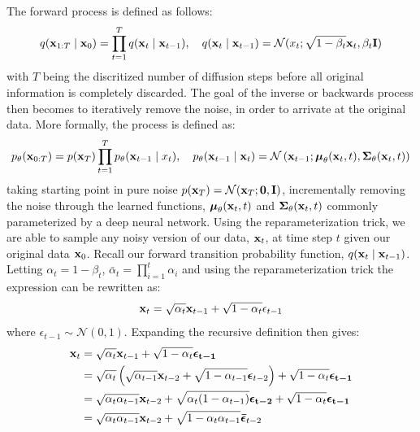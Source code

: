 The forward process is defined as follows:
\begin{equation}    
    q(\boldsymbol{\mathbf{x}}_{1:T} \mid \boldsymbol{\mathbf{x}}_{0}) = \prod_{t=1}^T q(\boldsymbol{\mathbf{x}}_{t} \mid \boldsymbol{\mathbf{x}}_{t-1}), \quad q(\boldsymbol{\mathbf{x}}_{t} \mid \boldsymbol{\mathbf{x}}_{t-1}) = \mathcal{N}(x_{t}; \sqrt{1 - \beta_t}\boldsymbol{\mathbf{x}}_t,\beta_t \boldsymbol{\mathbf{I}} )
\end{equation}
with $T$ being the discritized number of diffusion steps before all original information is completely discarded. The goal of the inverse or backwards process then becomes to iteratively remove the noise, in order to arrivate at the original data. More formally, the process is defined as:
\begin{equation}
    p_\theta(\boldsymbol{\mathbf{x}}_{0:T}) = p(\boldsymbol{\mathbf{x}}_T) \prod_{t=1}^T p_\theta(\boldsymbol{\mathbf{x}}_{t-1} \mid x_{t}), \quad p_\theta(\boldsymbol{\mathbf{x}}_{t-1} \mid \boldsymbol{\mathbf{x}}_{t}) = \mathcal{N}\left(\boldsymbol{\mathbf{x}}_{t-1}; \boldsymbol{\mathbf{\mu}}_\theta(\boldsymbol{\mathbf{x}}_t, t), \boldsymbol{\mathbf{\Sigma}}_\theta(\boldsymbol{\mathbf{x}}_t, t) \right)
\end{equation}
taking starting point in pure noise $p(\boldsymbol{\mathbf{x}}_T) = \mathcal{N}(\boldsymbol{\mathbf{x}}_T; \boldsymbol{\mathbf{0}}, \boldsymbol{\mathbf{I}})$, incrementally removing the noise through the learned functions, $\boldsymbol{\mathbf{\mu}}_\theta(\boldsymbol{\mathbf{x}}_t, t)$ and $\boldsymbol{\mathbf{\Sigma}}_\theta(\boldsymbol{\mathbf{x}}_t, t)$ commonly parameterized by a deep neural network.
Using the reparameterization trick, we are able to sample any noisy version of our data, $\boldsymbol{\mathbf{x}}_t$, at time step $t$ given our original data $\boldsymbol{\mathbf{x}}_0$. Recall our forward transition probability function, $q(\boldsymbol{\mathbf{x}}_t \mid \boldsymbol{\mathbf{x}}_{t-1})$. Letting $\alpha_t = 1 - \beta_t$, $\bar{\alpha}_t = \prod_{i=1}^t \alpha_i$ and using the reparameterization trick the expression can be rewritten as:
\begin{equation}
    \boldsymbol{\mathbf{x}}_t = \sqrt{\alpha_t} \boldsymbol{\mathbf{x}}_{t-1} + \sqrt{1 - \alpha_t} \epsilon_{t-1}
\end{equation}
where $\epsilon_{t-1} \sim \mathcal{N}(0,1)$. Expanding the recursive definition then gives:
\begin{align*}
    \boldsymbol{\mathbf{x}}_t    & = \sqrt{\alpha_t} \boldsymbol{\mathbf{x}}_{t-1} + \sqrt{1 - \alpha_t} \boldsymbol{\mathbf{\epsilon_{t-1}}} \\
                    & = \sqrt{\alpha_t} \left(
    \sqrt{\alpha_{t-1}} \boldsymbol{\mathbf{x}}_{t-2} + \sqrt{1 - \alpha_{t-1}} \boldsymbol{\mathbf{\epsilon}}_{t-2}
    \right) + \sqrt{1 - \alpha_t} \boldsymbol{\mathbf{\epsilon_{t-1}}} \\
                    & = \sqrt{\alpha_t \alpha_{t-1}} \boldsymbol{\mathbf{x}}_{t-2} + \sqrt{\alpha_t(1 - \alpha_{t-1})} \boldsymbol{\mathbf{\epsilon_{t-2}}} + \sqrt{1 - \alpha_{t}} \boldsymbol{\mathbf{\epsilon_{t-1}}} \\
                    & = \sqrt{\alpha_t \alpha_{t-1}} \boldsymbol{\mathbf{x}}_{t-2} + \sqrt{1 - \alpha_{t}\alpha_{t-1}} \boldsymbol{\mathbf{\bar{\epsilon}}}_{t-2}
\end{align*}
